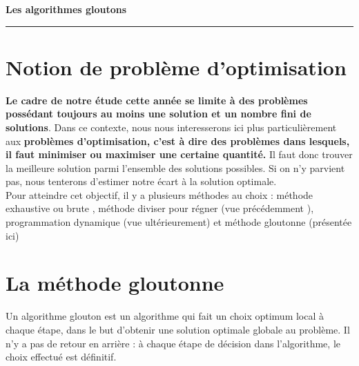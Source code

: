 \documentclass[12pt,french]{article}
\newcounter{sf}
\begin{document}
    \chead{}
      \renewcommand{\headrulewidth}{0.5pt}
      \lfoot{                      }
    \pagestyle{fancy}
    \renewcommand{\footrulewidth}{0.4pt}
\begin{center}
\textbf{\Large{Les algorithmes gloutons  }}\end{center}
\hrule

\section{Notion de problème d'optimisation}

 \textbf{Le cadre de notre étude cette année se limite à des problèmes possédant toujours au moins une solution et un nombre fini de solutions}. Dans ce contexte, nous nous interesserons ici plus particulièrement aux \textbf{problèmes d'optimisation, c'est à dire des problèmes dans lesquels, il faut minimiser ou maximiser une certaine quantité.} Il faut donc trouver la meilleure solution parmi l'ensemble des solutions possibles. Si on n'y parvient pas, nous tenterons d'estimer notre écart à la solution optimale.\\
Pour atteindre cet objectif, il y a plusieurs méthodes au choix : méthode exhaustive ou brute , méthode diviser pour régner (vue précédemment ), programmation dynamique (vue ultérieurement) et méthode gloutonne (présentée ici)
\normalsize
\section{La méthode gloutonne}
\begin{tcolorbox}[enhanced,attach boxed title to top center={yshift=-3mm,yshifttext=-1mm},
	colback=blue!5!white,colframe=blue!75!black,colbacktitle=blue!25!black,
	title=Définition, fonttitle=\bfseries,
	boxed title style={size=small,colframe=blue!25!black} ]
	Un algorithme glouton est un algorithme qui fait un choix optimum local à chaque étape, dans le but d'obtenir une solution optimale globale au problème. Il n'y a pas de
	retour en arrière : à chaque étape de décision dans l'algorithme, le choix effectué est définitif.
\end{tcolorbox}
\end{document}
